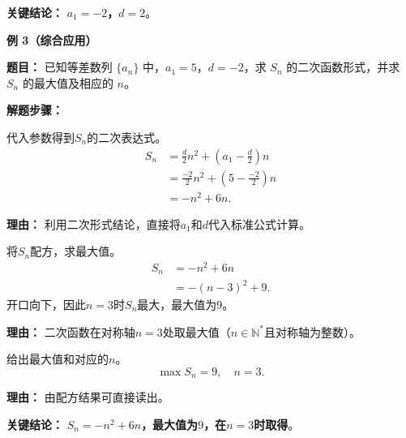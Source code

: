 \begin{examplebox}
	\textbf{\textcolor{CExample}{关键结论：}}
	\textbf{$a_1=-2$，$d=2$}。

	\medskip
	\textbf{\textcolor{CExample}{例 3（综合应用）}}

	\textbf{\textcolor{CExample}{题目：}}
	已知等差数列 $\{a_n\}$ 中，$a_1=5$，$d=-2$，求 $S_n$ 的二次函数形式，并求 $S_n$ 的最大值及相应的 $n$。

	\textbf{\textcolor{CExample}{解题步骤：}}
	\begin{description}[style=nextline, leftmargin=2.8em, labelsep=0.5em, itemsep=0.45em]
		\item[\textbf{第一步（写出形式）：}] 代入参数得到$S_n$的二次表达式。
			\[
				\begin{aligned}
					S_n &= \frac{d}{2}n^2 + \left(a_1-\frac{d}{2}\right)n \\
					&= \frac{-2}{2}n^2 + \left(5 - \frac{-2}{2}\right)n \\
					&= -n^2 + 6n.
			\end{aligned}
			\]
			\par\textbf{理由：} 利用二次形式结论，直接将$a_1$和$d$代入标准公式计算。
		\item[\textbf{第二步（配方求最值）：}] 将$S_n$配方，求最大值。
			\[
				\begin{aligned}
					S_n &= -n^2+6n \\
					&= -(n-3)^2+9.
			\end{aligned}
			\]
			开口向下，因此$n=3$时$S_n$最大，最大值为$9$。
			\par\textbf{理由：} 二次函数在对称轴$n=3$处取最大值（$n\in\mathbb{N}^*$且对称轴为整数）。
		\item[\textbf{第三步（结论）：}] 给出最大值和对应的$n$。
			\[
				\max S_n = 9,\quad n=3.
			\]
			\par\textbf{理由：} 由配方结果可直接读出。
	\end{description}

	\textbf{\textcolor{CExample}{关键结论：}}
	\textbf{$S_n = -n^2+6n$，最大值为$9$，在$n=3$时取得}。
\end{examplebox}
